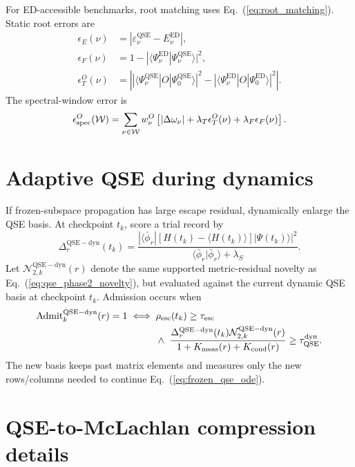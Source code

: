 \documentclass[
  reprint,
  amsmath,
  amssymb,
  aps,
  pra,
  nofootinbib,
  superscriptaddress,
  floatfix
]{revtex4-2}
\newcommand{\Wcal}{\mathcal{W}}
\newcommand{\dyn}{\mathrm{dyn}}
\newcommand{\qse}{\mathrm{QSE}}
\newcommand{\ed}{\mathrm{ED}}
\newcommand{\ket}[1]{|#1\rangle}
\newcommand{\bra}[1]{\langle #1|}
\newcommand{\braket}[2]{\langle #1|#2\rangle}
\newcommand{\expval}[1]{\langle #1\rangle}
\begin{document}
For ED-accessible benchmarks, root matching uses Eq.~(\ref{eq:root_matching}).  Static root errors are
\begin{align}
\epsilon_E(\nu)&=|\varepsilon_\nu^{\qse}-E_\nu^{\ed}|,
\nonumber\\
\epsilon_F(\nu)&=1-|\braket{\Psi_\nu^{\ed}}{\Psi_\nu^{\qse}}|^2,
\nonumber\\
\epsilon_T^O(\nu)&=
\left|
|\bra{\Psi_\nu^{\qse}}O\ket{\Psi_0^{\qse}}|^2
-
|\bra{\Psi_\nu^{\ed}}O\ket{\Psi_0^{\ed}}|^2
\right|.
\label{eq:app_root_metrics}
\end{align}
The spectral-window error is
\begin{equation}
\epsilon_{\rm spec}^{O}(\Wcal)
=
\sum_{\nu\in\Wcal}
w_\nu^{O}
\left[
|\Delta\omega_\nu|
+
\lambda_T\epsilon_T^O(\nu)
+
\lambda_F\epsilon_F(\nu)
\right].
\label{eq:app_spectral_error}
\end{equation}

\section{Adaptive QSE during dynamics}
\label{app:adaptive_qse_dynamics}

If frozen-subspace propagation has large escape residual, dynamically enlarge the QSE basis.  At checkpoint $t_k$, score a trial record by
\begin{equation}
\Delta_r^{\qse-\dyn}(t_k)
=
\frac{
|\bra{\bar\phi_r}
[H(t_k)-\expval{H(t_k)}]\ket{\Psi(t_k)}|^2
}{
\braket{\bar\phi_r}{\bar\phi_r}+\lambda_S
}.
\label{eq:app_qse_dyn_gain}
\end{equation}
Let $\mathcal N_{2,k}^{\qse-\dyn}(r)$ denote the same supported metric-residual novelty as Eq.~(\ref{eq:qse_phase2_novelty}), but evaluated against the current dynamic QSE basis at checkpoint $t_k$.
Admission occurs when
\begin{equation}
\begin{aligned}
\operatorname{Admit}_{k}^{\qse-\dyn}(r)=1
\iff{}&
\rho_{\rm esc}(t_k)\ge\tau_{\rm esc}
\\
&\wedge\
\frac{
\Delta_r^{\qse-\dyn}(t_k)\mathcal N_{2,k}^{\qse-\dyn}(r)
}{
1+K_{\rm meas}(r)+K_{\rm cond}(r)
}
\ge\tau_{\qse}^{\dyn}.
\end{aligned}
\label{eq:app_adaptive_qse_admit}
\end{equation}
The new basis keeps past matrix elements and measures only the new rows/columns needed to continue Eq.~(\ref{eq:frozen_qse_ode}).

\section{QSE-to-McLachlan compression details}
\label{app:qse_to_mclachlan_details}
\end{document}
